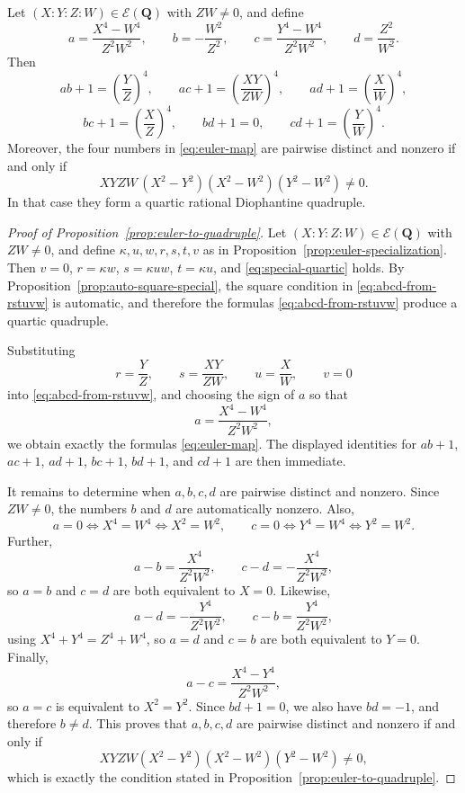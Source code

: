 \documentclass[10pt,a4paper]{amsart}
\newcommand{\Eul}{\mathcal{E}}
\newcommand{\Q}{\mathbf{Q}}
\begin{document}
\begin{proposition}\label{prop:euler-to-quadruple}
Let $(X:Y:Z:W)\in \Eul(\Q)$ with $ZW\neq 0$, and define
\begin{equation}\label{eq:euler-map}
 a=\frac{X^4-W^4}{Z^2W^2},\qquad
 b=-\frac{W^2}{Z^2},\qquad
 c=\frac{Y^4-W^4}{Z^2W^2},\qquad
 d=\frac{Z^2}{W^2}.
\end{equation}
Then
\[
ab+1=\left(\frac{Y}{Z}\right)^4,
\qquad
ac+1=\left(\frac{XY}{ZW}\right)^4,
\qquad
ad+1=\left(\frac{X}{W}\right)^4,
\]
\[
bc+1=\left(\frac{X}{Z}\right)^4,
\qquad
bd+1=0,
\qquad
cd+1=\left(\frac{Y}{W}\right)^4.
\]
Moreover, the four numbers in \eqref{eq:euler-map} are pairwise distinct and nonzero if and only if
\begin{equation}\label{eq:nondeg-euler}
XYZW\,(X^2-Y^2)(X^2-W^2)(Y^2-W^2)\neq 0.
\end{equation}
In that case they form a quartic rational Diophantine quadruple.
\end{proposition}

\begin{proof}[Proof of Proposition~\ref{prop:euler-to-quadruple}]
Let $(X:Y:Z:W)\in\Eul(\Q)$ with $ZW\neq 0$, and define $\kappa,u,w,r,s,t,v$ as in Proposition~\ref{prop:euler-specialization}. Then $v=0$, $r=\kappa w$, $s=\kappa uw$, $t=\kappa u$, and \eqref{eq:special-quartic} holds. By Proposition~\ref{prop:auto-square-special}, the square condition in \eqref{eq:abcd-from-rstuvw} is automatic, and therefore the formulas \eqref{eq:abcd-from-rstuvw} produce a quartic quadruple.

Substituting
\[
r=\frac{Y}{Z},\qquad s=\frac{XY}{ZW},\qquad u=\frac{X}{W},\qquad v=0
\]
into \eqref{eq:abcd-from-rstuvw}, and choosing the sign of $a$ so that
\[
a=\frac{X^4-W^4}{Z^2W^2},
\]
we obtain exactly the formulas \eqref{eq:euler-map}. The displayed identities for $ab+1$, $ac+1$, $ad+1$, $bc+1$, $bd+1$, and $cd+1$ are then immediate.

It remains to determine when $a,b,c,d$ are pairwise distinct and nonzero. Since $ZW\neq 0$, the numbers $b$ and $d$ are automatically nonzero. Also,
\[
a=0 \iff X^4=W^4 \iff X^2=W^2,
\qquad
c=0 \iff Y^4=W^4 \iff Y^2=W^2.
\]
Further,
\[
a-b=\frac{X^4}{Z^2W^2},
\qquad
c-d=-\frac{X^4}{Z^2W^2},
\]
so $a=b$ and $c=d$ are both equivalent to $X=0$. Likewise,
\[
a-d=-\frac{Y^4}{Z^2W^2},
\qquad
c-b=\frac{Y^4}{Z^2W^2},
\]
using $X^4+Y^4=Z^4+W^4$, so $a=d$ and $c=b$ are both equivalent to $Y=0$. Finally,
\[
a-c=\frac{X^4-Y^4}{Z^2W^2},
\]
so $a=c$ is equivalent to $X^2=Y^2$. Since $bd+1=0$, we also have $bd=-1$, and therefore $b\neq d$. This proves that $a,b,c,d$ are pairwise distinct and nonzero if and only if
\[
XYZW(X^2-Y^2)(X^2-W^2)(Y^2-W^2)\neq 0,
\]
which is exactly the condition stated in Proposition~\ref{prop:euler-to-quadruple}.
\end{proof}
\end{document}
